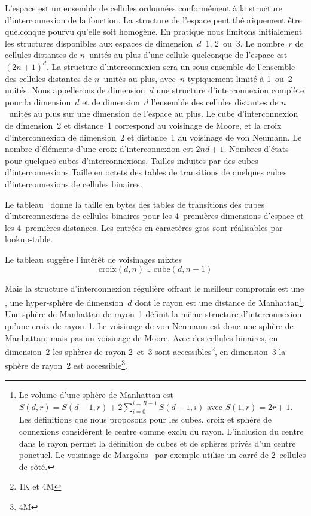 L'espace est un ensemble de cellules ordonn\'ees conform\'ement \`a la
structure d'interconnexion de la fonction. %
La structure de l'espace peut th\'eoriquement \^etre quelconque pourvu
qu'elle soit homog\`ene. %
En pratique nous limitons initialement les structures disponibles aux
espaces de dimension~$d$~1, 2~ou~3. %
%
Le nombre~$r$ de cellules distantes de $n$~unit\'es au plus d'une
cellule quelconque de l'espace est $(2n + 1)^{d}$. %
La structure d'interconnexion sera un sous-ensemble de l'ensemble des
cellules distantes de $n$~unit\'es au plus, avec~$n$ typiquement limit\'e
\`a 1~ou~2 unit\'es. %
Nous appellerons  de dimension~$d$ une
structure d'interconnexion compl\`ete pour la dimension~$d$ et
 de dimension~$d$ l'ensemble des
cellules distantes de $n$~unit\'es au plus sur une dimension de l'espace
au plus. %
Le cube d'interconnexion de dimension~2 et distance~1 correspond au
voisinage de Moore, et la croix d'interconnexion de dimension~2 et
distance~1 au voisinage de von Neumann. %
Le nombre d'\'el\'ements d'une croix d'interconnexion est $2 n d + 1$.
%
{Nombres d'\'etats pour quelques cubes d'interconnexions,}%
{Tailles induites par des cubes d'interconnexions}%
{Taille en octets des tables de transitions de quelques cubes
  d'interconnexions de cellules binaires.}

Le tableau~ donne la taille en bytes
des tables de transitions des cubes d'interconnexions de cellules
binaires pour les 4~premi\`eres dimensions d'espace et les 4~premi\`eres
distances. %
Les entr\'ees en caract\`eres gras sont r\'ealisables par lookup-table.

Le tableau  sugg\`ere l'int\'er\^et de
voisinages mixtes
\[\text{croix}(d, n) \cup \text{cube}(d, n - 1)\]

Mais la structure d'interconnexion r\'eguli\`ere offrant le meilleur
compromis  est une , une hyper-sph\`ere de dimension~$d$ dont le rayon est une
distance de Manhattan\footnote{%
  Le volume d'une sph\`ere de Manhattan est %
  $S(d, r) = S(d - 1, r) + 2 \sum_{i=0}^{i=R-1} S(d - 1, i)$ %
  avec $S(1, r) = 2r + 1$. %
  Les d\'efinitions que nous proposons pour les cubes, croix et sph\`ere de
  connexions consid\`erent le centre comme exclu du rayon. %
  L'inclusion du centre dans le rayon permet la d\'efinition de cubes et
  de sph\`eres priv\'es d'un centre ponctuel. %
  Le voisinage de Margolus~\cite[]{Toffoli87} par exemple utilise un
  carr\'e de 2~cellules de c\^ot\'e.}. %
Une sph\`ere de Manhattan de rayon~1 d\'efinit la m\^eme structure
d'interconnexion qu'une croix de rayon~1. %
Le voisinage de von Neumann est donc une sph\`ere de Manhattan, mais pas
un voisinage de Moore. %
Avec des cellules binaires, en dimension~2 les sph\`eres de rayon
2~et~3 sont accessibles\footnote{1K et 4M}, en dimension~3 la sph\`ere
de rayon~2 est accessible\footnote{4M}.

